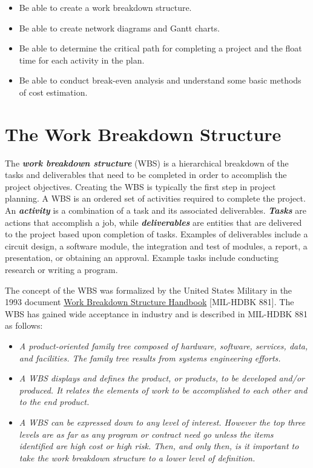 \begin{itemize}
\item
  Be able to create a work breakdown structure.
\item
  Be able to create network diagrams and Gantt charts.
\item
  Be able to determine the critical path for completing a project and
  the float time for each activity in the plan.
\item
  Be able to conduct break-even analysis and understand some basic
  methods of cost estimation.
\end{itemize}

\section{The Work Breakdown Structure}
\label{section:the-work-breakdown-structure}

The \emph{\textbf{work breakdown structure}} (WBS) is a hierarchical
breakdown of the tasks and deliverables that need to be completed in
order to accomplish the project objectives. Creating the WBS is
typically the first step in project planning. A WBS is an ordered set of
activities required to complete the project. An \emph{\textbf{activity}}
is a combination of a task and its associated deliverables.
\emph{\textbf{Tasks}} are actions that accomplish a job, while
\emph{\textbf{deliverables}} are entities that are delivered to the
project based upon completion of tasks. Examples of deliverables include
a circuit design, a software module, the integration and test of
modules, a report, a presentation, or obtaining an approval. Example
tasks include conducting research or writing a program.

The concept of the WBS was formalized by the United States Military in
the 1993 document \ul{Work Breakdown Structure Handbook} {[}MIL-HDBK
881{]}. The WBS has gained wide acceptance in industry and is described
in MIL-HDBK 881 as follows:

\begin{itemize}
\item
  \emph{A product-oriented family tree composed of hardware, software,
  services, data, and facilities. The family tree results from systems
  engineering efforts.}
\item
  \emph{A WBS displays and defines the product, or products, to be
  developed and/or produced. It relates the elements of work to be
  accomplished to each other and to the end product.}
\item
  \emph{A WBS can be expressed down to any level of interest. However
  the top three levels are as far as any program or contract need go
  unless the items identified are high cost or high risk. Then, and only
  then, is it important to take the work breakdown structure to a lower
  level of definition.}
\end{itemize}

